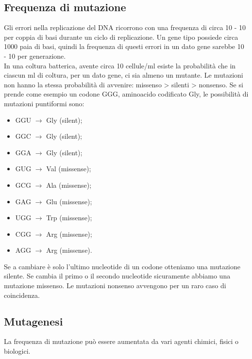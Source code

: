 \subsection{Frequenza di mutazione}
Gli errori nella replicazione del DNA ricorrono con una frequenza di circa 10 - 10 per coppia di basi durante un ciclo di replicazione. Un gene tipo possiede circa 1000 paia di basi, quindi la frequenza di questi errori in un dato gene sarebbe 10 - 10 per generazione. 
\\In una coltura batterica, avente circa 10 cellule/ml esiste la probabilità che in ciascun ml di coltura, per un dato gene, ci sia almeno un mutante. Le mutazioni non hanno la stessa probabilità di avvenire: missenso > silenti > nonsenso.
Se si prende come esempio un codone GGG, aminoacido codificato Gly, le possibilità di mutazioni puntiformi sono:
\begin{itemize}
    \item GGU $\xrightarrow{}$ Gly (silent);
    \item GGC $\xrightarrow{}$ Gly (silent);
    \item GGA $\xrightarrow{}$ Gly (silent);
    \item GUG $\xrightarrow{}$ Val (missense);
    \item GCG $\xrightarrow{}$ Ala (missense);
    \item GAG $\xrightarrow{}$ Glu (missense);
    \item UGG $\xrightarrow{}$ Trp (missense);
    \item CGG $\xrightarrow{}$ Arg (missense);
    \item AGG $\xrightarrow{}$ Arg (missense).
\end{itemize}
Se a cambiare è solo l'ultimo nucleotide di un codone otteniamo una mutazione silente. Se cambia il primo o il secondo nucleotide sicuramente abbiamo una mutazione missenso. Le mutazioni nonsenso avvengono per un raro caso di coincidenza. 
\subsection{Mutagenesi}
La frequenza di mutazione può essere aumentata da vari agenti chimici, fisici o biologici.   
